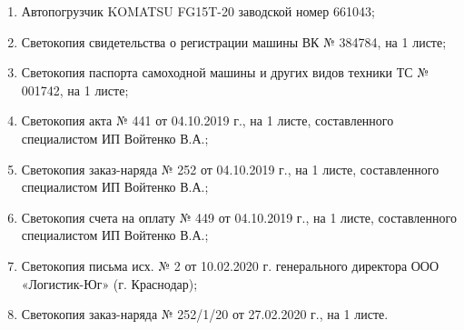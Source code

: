 \begin{enumerate}
	\item 	Автопогрузчик KOMATSU FG15T-20 заводской номер 661043;
	\item 	Светокопия свидетельства о регистрации машины  ВК № 384784,  на 1 листе;
	\item 	Светокопия паспорта самоходной машины и других видов техники ТС № 001742, на 1 листе;
	\item 	Светокопия акта № 441 от 04.10.2019 г., на 1 листе, составленного специалистом ИП Войтенко В.А.;
	\item 	Светокопия заказ-наряда № 252 от 04.10.2019 г., на 1 листе, составленного специалистом ИП Войтенко В.А.;
	\item 	Светокопия счета на оплату № 449 от 04.10.2019 г., на 1 листе, составленного специалистом ИП Войтенко В.А.;
	\item 	Светокопия письма исх. № 2 от 10.02.2020 г. генерального директора ООО «Логистик-Юг» (г. Краснодар);
	\item 	Светокопия заказ-наряда № 252/1/20 от 27.02.2020 г., на 1 листе.
\end{enumerate}